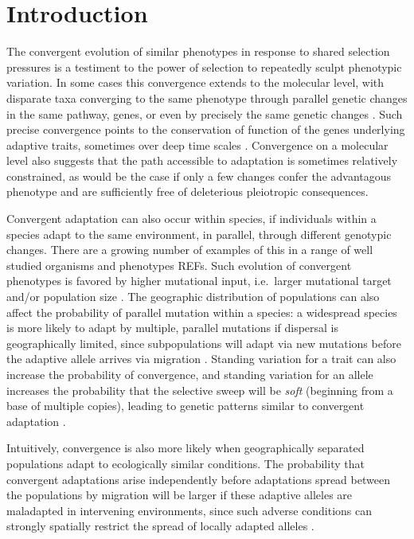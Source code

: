 \documentclass{article}
\begin{document}
\section{Introduction}

The convergent evolution of similar phenotypes in response to shared
selection pressures is a testiment to the power of selection to
repeatedly sculpt phenotypic variation. 
In some cases this convergence extends to the molecular level, 
with disparate taxa converging to the same phenotype through parallel 
genetic changes in the same pathway, genes, 
or even by precisely the same genetic changes \citep{zhen2012parallel}. 
Such precise convergence points to the conservation of function of the genes underlying adaptive traits, 
sometimes over deep time scales \citep{deephomologypapers}. 
Convergence on a molecular level also suggests that the path 
accessible to adaptation is sometimes relatively constrained, 
as would be the case if only a few changes confer the advantagous phenotype 
and are sufficiently free of deleterious pleiotropic consequences.


Convergent adaptation can also occur within species, if individuals within a species 
adapt to the same environment, in parallel, through different genotypic changes. 
There are a growing number of examples of this in a range of well studied organisms and phenotypes REFs.
Such evolution of convergent phenotypes is favored by higher mutational input, 
i.e.\ larger mutational target and/or population size \citep{dmitri}.
The geographic distribution of populations can also affect the probability of parallel mutation within a species:
a widespread species is more likely to adapt by multiple, parallel mutations if dispersal is geographically limited, 
since subpopulations will adapt via new mutations before the adaptive allele arrives via migration \citep{ralph2010parallel}. 
Standing variation for a trait can also increase the probability of convergence, 
and standing variation for an allele increases the probability that the selective sweep will be \emph{soft}
(beginning from a base of multiple copies),
leading to genetic patterns similar to convergent adaptation \citep{orr2001sieve,softsweepsI}. 

Intuitively, convergence is also more likely 
when geographically separated populations adapt to ecologically similar conditions. 
The probability that convergent adaptations arise independently
before adaptations spread between the populations by migration
will be larger if these adaptive alleles are maladapted in intervening environments,
since such adverse conditions can strongly spatially restrict the spread of locally adapted alleles \citep{slatkin1973geneflow}.
 
\end{document}

